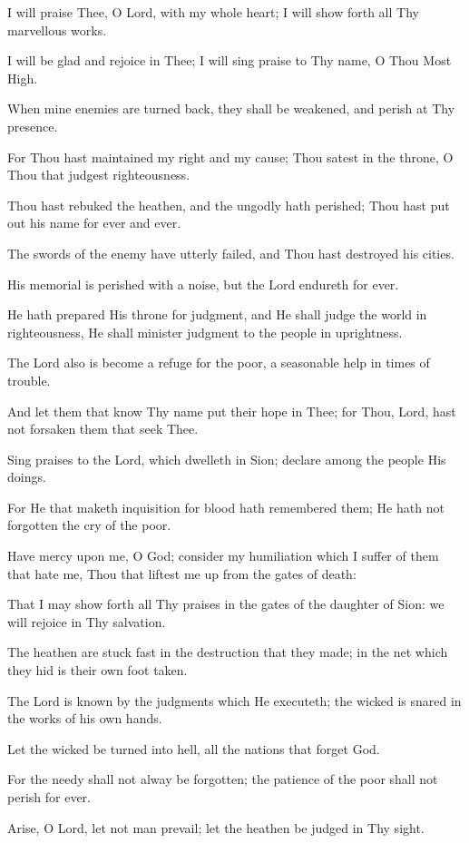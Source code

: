 I will praise Thee, O Lord, with my whole heart; I will show forth all Thy marvellous works.

I will be glad and rejoice in Thee; I will sing praise to Thy name, O Thou Most High.

When mine enemies are turned back, they shall be weakened, and perish at Thy presence.

For Thou hast maintained my right and my cause; Thou satest in the throne, O Thou that judgest righteousness.

Thou hast rebuked the heathen, and the ungodly hath perished; Thou hast put out his name for ever and ever.

The swords of the enemy have utterly failed, and Thou hast destroyed his cities.

His memorial is perished with a noise, but the Lord endureth for ever.

He hath prepared His throne for judgment, and He shall judge the world in righteousness, He shall minister judgment to the people in uprightness.

The Lord also is become a refuge for the poor, a seasonable help in times of trouble.

And let them that know Thy name put their hope in Thee; for Thou, Lord, hast not forsaken them that seek Thee.

Sing praises to the Lord, which dwelleth in Sion; declare among the people His doings.

For He that maketh inquisition for blood hath remembered them; He hath not forgotten the cry of the poor.

Have mercy upon me, O God; consider my humiliation which I suffer of them that hate me, Thou that liftest me up from the gates of death:

That I may show forth all Thy praises in the gates of the daughter of Sion: we will rejoice in Thy salvation.

The heathen are stuck fast in the destruction that they made; in the net which they hid is their own foot taken.

The Lord is known by the judgments which He executeth; the wicked is snared in the works of his own hands.

Let the wicked be turned into hell, all the nations that forget God.

For the needy shall not alway be forgotten; the patience of the poor shall not perish for ever.

Arise, O Lord, let not man prevail; let the heathen be judged in Thy sight.


